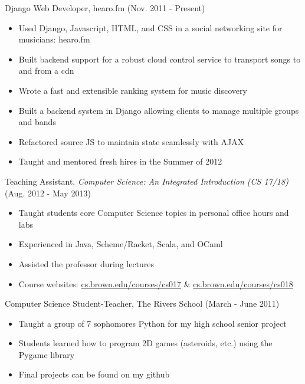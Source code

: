 \documentclass[11pt]{res} %
\begin{document}
\begin{resume}
Django Web Developer, 
hearo.fm 
(Nov. 2011 - Present)
\vspace{0.02in}
   \begin{itemize} \itemsep -2pt
   \item Used Django, Javascript, HTML, and CSS in a social networking site for musicians: hearo.fm
   \item Built backend support for a robust cloud control service to transport songs to and from a cdn
   \item Wrote a fast and extensible ranking system for music discovery
   \item Built a backend system in Django allowing clients to manage multiple groups and bands
   \item Refactored source JS to maintain state seamlessly with AJAX
   \item Taught and mentored fresh hires in the Summer of 2012
   \end{itemize}

Teaching Assistant, \emph{Computer Science: An Integrated Introduction (CS 17/18)}\\
(Aug. 2012 - May 2013)
\vspace{0.02in}
   \begin{itemize} \itemsep -2pt
   \item Taught students core Computer Science topics in personal office hours and labs
   \item Experienced in Java, Scheme/Racket, Scala, and OCaml
   \item Assisted the professor during lectures
   \item Course websites:
      \href{http://cs.brown.edu/courses/cs017}{cs.brown.edu/courses/cs017} \&
      \href{http://cs.brown.edu/courses/cs018}{cs.brown.edu/courses/cs018}

   \end{itemize}

Computer Science Student-Teacher, 
The Rivers School 
(March - June 2011)
\vspace{0.02in}
   \begin{itemize} \itemsep -2pt  %
   \item Taught a group of 7 sophomores Python for my high school senior project
   \item Students learned how to program 2D games (asteroids, etc.) using the Pygame library
   \item Final projects can be found on my github
 \end{itemize}


\end{resume}
\end{document}
